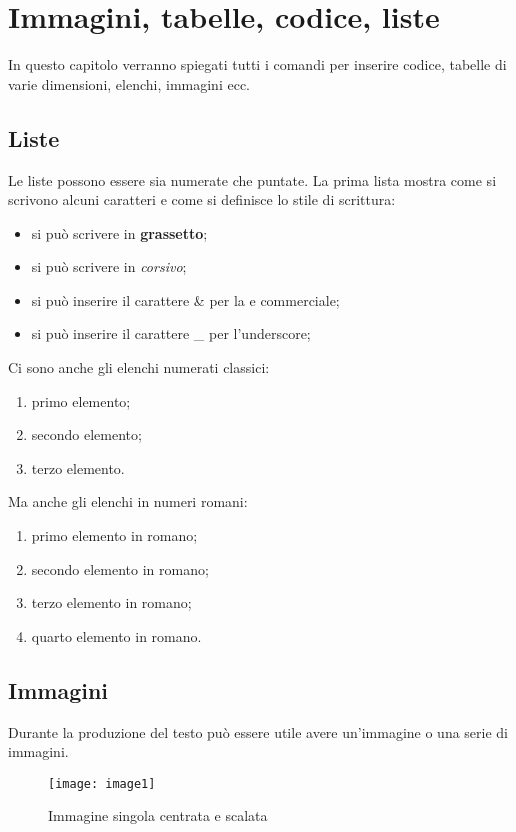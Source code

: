 \chapter{Immagini, tabelle, codice, liste}
In questo capitolo verranno spiegati tutti i comandi per inserire codice, tabelle di varie dimensioni, elenchi, immagini ecc.


\section{Liste}
Le liste possono essere sia numerate che puntate. La prima lista mostra come si scrivono alcuni caratteri e come si definisce lo stile di scrittura:
\begin{itemize}
    \item si può scrivere in \textbf{grassetto};
    \item si può scrivere in \textit{corsivo};
    \item si può inserire il carattere \& per la e commerciale;
    \item si può inserire il carattere \_ per l'underscore;
\end{itemize}

Ci sono anche gli elenchi numerati classici:
\begin{enumerate}
    \item primo elemento;
    \item secondo elemento;
    \item terzo elemento.
\end{enumerate}

Ma anche gli elenchi in numeri romani:
\begin{enumerate}[I]    %
    \item primo elemento in romano;
    \item secondo elemento in romano;
    \item terzo elemento in romano;
    \item quarto elemento in romano.
\end{enumerate}


\section{Immagini}
Durante la produzione del testo può essere utile avere un'immagine o una serie di immagini.

\begin{figure}[H]
	\centering
	\texttt{[image: image1]} %
	\caption{Immagine singola centrata e scalata}
	\label{capitolo2:image1}
\end{figure}


